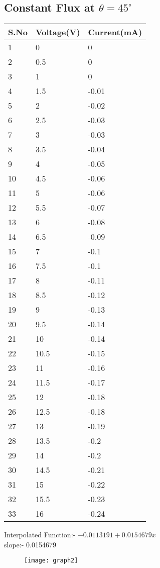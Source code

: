 \documentclass[
	letterpaper, %
	10pt, %
]{CSUniSchoolLabReport}
\begin{document}
	\subsection{Constant Flux at \(\theta = 45^{\circ}\) }
	\begin{center}
	\begin{tabular}{ | m{1cm} | m{3cm}| m{3cm} | } 
	\hline
	S.No & Voltage(V) & Current(mA) \\
	\hline
	1&0&0\\
	2&0.5&0\\
	3&1&0\\
	4&1.5&-0.01\\
	5&2&-0.02\\
	6&2.5&-0.03\\
	7&3&-0.03\\
	8&3.5&-0.04\\
	9&4&-0.05\\
	10&4.5&-0.06\\
	11&5&-0.06\\
	12&5.5&-0.07\\
	13&6&-0.08\\
	14&6.5&-0.09\\
	15&7&-0.1\\
	16&7.5&-0.1\\
	17&8&-0.11\\
	18&8.5&-0.12\\
	19&9&-0.13\\
	20&9.5&-0.14\\
	21&10&-0.14\\
	22&10.5&-0.15\\
	23&11&-0.16\\
	24&11.5&-0.17\\
	25&12&-0.18\\
	26&12.5&-0.18\\
	27&13&-0.19\\
	28&13.5&-0.2\\
	29&14&-0.2\\
	30&14.5&-0.21\\
	31&15&-0.22\\
	32&15.5&-0.23\\
	33&16&-0.24\\
	\hline

	\end{tabular}
	\end{center}
	Interpolated Function:- \(-0.0113191 + 0.0154679 x\) \\
	slope:- 0.0154679 
	\begin{figure}[H] %
		\centering %
		\texttt{[image: graph2]} %
		\caption{}
	\end{figure}
\end{document}
